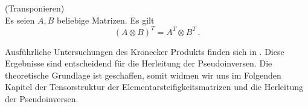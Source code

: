 \begin{Lemma} (Transponieren) \label{lemma:transpose} \\
Es seien $A,B$ beliebige Matrizen. Es gilt
\begin{equation*}
(A \otimes B)^T=A^T \otimes B^T \, .
\end{equation*}
\end{Lemma}

Ausführliche Untersuchungen des Kronecker Produkts finden sich in \cite{Kronecker}.
Diese Ergebnisse sind entscheidend für die Herleitung der Pseudoinversen. Die theoretische Grundlage ist geschaffen, somit widmen wir uns im Folgenden Kapitel der Tensorstruktur der Elementarsteifigkeitsmatrizen und die Herleitung der Pseudoinversen.

